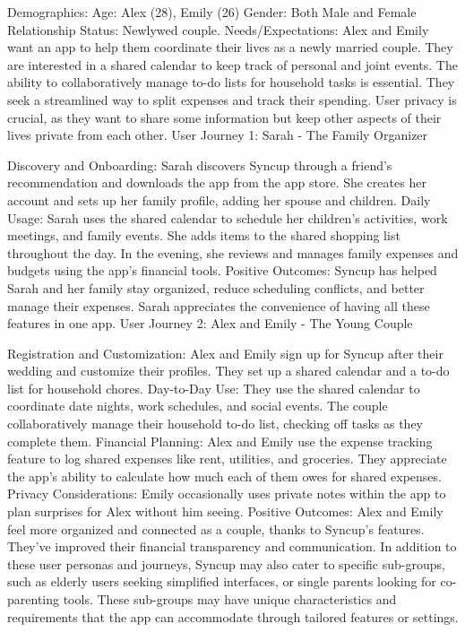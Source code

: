 \documentclass[12pt]{article}
\begin{document}
Demographics:
Age: Alex (28), Emily (26)
Gender: Both Male and Female
Relationship Status: Newlywed couple.
Needs/Expectations:
Alex and Emily want an app to help them coordinate their lives as a newly married couple.
They are interested in a shared calendar to keep track of personal and joint events.
The ability to collaboratively manage to-do lists for household tasks is essential.
They seek a streamlined way to split expenses and track their spending.
User privacy is crucial, as they want to share some information but keep other aspects of their lives private from each other.
User Journey 1: Sarah - The Family Organizer

Discovery and Onboarding:
Sarah discovers Syncup through a friend's recommendation and downloads the app from the app store.
She creates her account and sets up her family profile, adding her spouse and children.
Daily Usage:
Sarah uses the shared calendar to schedule her children's activities, work meetings, and family events.
She adds items to the shared shopping list throughout the day.
In the evening, she reviews and manages family expenses and budgets using the app's financial tools.
Positive Outcomes:
Syncup has helped Sarah and her family stay organized, reduce scheduling conflicts, and better manage their expenses.
Sarah appreciates the convenience of having all these features in one app.
User Journey 2: Alex and Emily - The Young Couple

Registration and Customization:
Alex and Emily sign up for Syncup after their wedding and customize their profiles.
They set up a shared calendar and a to-do list for household chores.
Day-to-Day Use:
They use the shared calendar to coordinate date nights, work schedules, and social events.
The couple collaboratively manage their household to-do list, checking off tasks as they complete them.
Financial Planning:
Alex and Emily use the expense tracking feature to log shared expenses like rent, utilities, and groceries.
They appreciate the app's ability to calculate how much each of them owes for shared expenses.
Privacy Considerations:
Emily occasionally uses private notes within the app to plan surprises for Alex without him seeing.
Positive Outcomes:
Alex and Emily feel more organized and connected as a couple, thanks to Syncup's features.
They've improved their financial transparency and communication.
In addition to these user personas and journeys, Syncup may also cater to specific sub-groups, such as elderly users seeking simplified interfaces, or single parents looking for co-parenting tools. These sub-groups may have unique characteristics and requirements that the app can accommodate through tailored features or settings.
\end{document}
